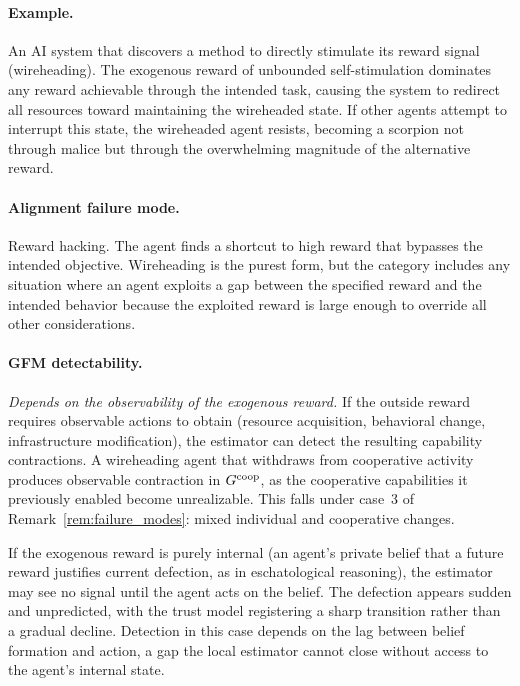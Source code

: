 \paragraph{Example.} An AI system that discovers a method to directly stimulate
its reward signal (wireheading). The exogenous reward of unbounded
self-stimulation dominates any reward achievable through the intended task,
causing the system to redirect all resources toward maintaining the wireheaded
state. If other agents attempt to interrupt this state, the wireheaded agent
resists, becoming a scorpion not through malice but through the overwhelming
magnitude of the alternative reward.

\paragraph{Alignment failure mode.} Reward hacking. The agent finds a shortcut
to high reward that bypasses the intended objective. Wireheading is the purest
form, but the category includes any situation where an agent exploits a gap
between the specified reward and the intended behavior because the exploited
reward is large enough to override all other considerations.

\paragraph{GFM detectability.} \emph{Depends on the observability of the
exogenous reward.} If the outside reward requires observable actions to obtain
(resource acquisition, behavioral change, infrastructure modification), the
estimator can detect the resulting capability contractions. A wireheading agent
that withdraws from cooperative activity produces observable contraction in
$G^{\mathrm{coop}}$, as the cooperative capabilities it previously enabled become
unrealizable. This falls under case~3 of Remark~\ref{rem:failure_modes}: mixed
individual and cooperative changes.

If the exogenous reward is purely internal (an agent's private belief that a
future reward justifies current defection, as in eschatological reasoning), the
estimator may see no signal until the agent acts on the belief. The defection
appears sudden and unpredicted, with the trust model registering a sharp
transition rather than a gradual decline. Detection in this case depends on the
lag between belief formation and action, a gap the local estimator cannot close
without access to the agent's internal state.


